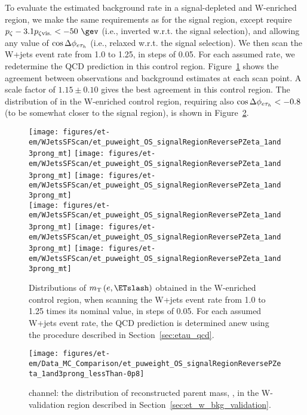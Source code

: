 To evaluate the estimated background rate in a signal-depleted and
W-enriched region, we make the same requirements as for the signal
region, except require $p_{\zeta} - 3.1 p_{\zeta\mathrm{vis.}}<
-50~\gev$ (i.e., inverted w.r.t. the signal selection), and allowing
any value of $\cos{\Delta\phi_{e\ensuremath{\tau_h}}}$ (i.e., relaxed w.r.t. the
signal selection).  We then scan the W+jets event rate from 1.0 to
1.25, in steps of 0.05.  For each assumed rate, we redetermine the QCD
prediction in this control region.  Figure~\ref{fig:etau_w_sf} shows
the agreement between observations and background estimates at each
scan point.  A scale factor of $1.15\pm0.10$ gives the best agreement
in this control region.  The distribution of \meffetau in the
W-enriched control region, requiring also
$\cos{\Delta\phi_{e\ensuremath{\tau_h}}}<-0.8$ (to be somewhat closer to the signal
region), is shown in Figure~\ref{fig:et_meff_flipped_pz}.

\begin{figure}\centering
  \texttt{[image: figures/et-em/WJetsSFScan/et\_puweight\_OS\_signalRegionReversePZeta\_1and3prong\_mt]}
  \texttt{[image: figures/et-em/WJetsSFScan/et\_puweight\_OS\_signalRegionReversePZeta\_1and3prong\_mt]}
  \texttt{[image: figures/et-em/WJetsSFScan/et\_puweight\_OS\_signalRegionReversePZeta\_1and3prong\_mt]}\\
  \texttt{[image: figures/et-em/WJetsSFScan/et\_puweight\_OS\_signalRegionReversePZeta\_1and3prong\_mt]}
  \texttt{[image: figures/et-em/WJetsSFScan/et\_puweight\_OS\_signalRegionReversePZeta\_1and3prong\_mt]}
  \texttt{[image: figures/et-em/WJetsSFScan/et\_puweight\_OS\_signalRegionReversePZeta\_1and3prong\_mt]}
  \caption{\label{fig:etau_w_sf} Distributions of
    $m_\mathrm{T}\left(e,\ETslash\right)$ obtained in the W-enriched
    control region, when scanning the W+jets event rate from 1.0 to
    1.25 times its nominal value, in steps of 0.05.  For each assumed
    W+jets event rate, the QCD prediction is determined anew using the
    procedure described in Section~\ref{sec:etau_qcd}.}
\end{figure}

\begin{figure}\centering
  \texttt{[image: figures/et-em/Data\_MC\_Comparison/et\_puweight\_OS\_signalRegionReversePZeta\_1and3prong\_lessThan-0p8]}
  \caption{\label{fig:et_meff_flipped_pz} \teth channel: the
    distribution of reconstructed parent mass, \meffetau, in the
    W-validation region described in
    Section~\ref{sec:et_w_bkg_validation}.}
\end{figure}

